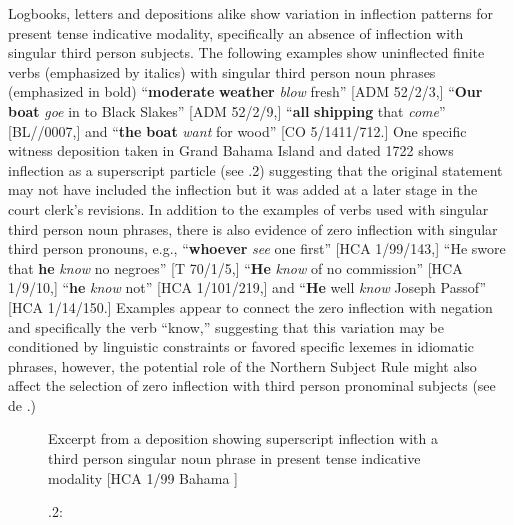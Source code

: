   Logbooks, letters and depositions alike show variation in inflection patterns for present tense indicative modality, specifically an absence of inflection with singular third person subjects. The following examples show uninflected finite verbs (emphasized by italics) with singular third person noun phrases (emphasized in bold) “\textbf{moderate} \textbf{weather} \textit{blow} fresh” [ADM 52/2/3,] “\textbf{Our} \textbf{boat} \textit{goe} in to Black Slakes” [ADM 52/2/9,] “\textbf{all} \textbf{shipping} that \textit{come}” [BL/\citealt{Egerton2395}/0007,] and “\textbf{the} \textbf{boat} \textit{want} for wood” [CO 5/1411/712.] One specific witness deposition taken in Grand Bahama Island and dated 1722 shows inflection as a superscript particle (see .2) suggesting that the original statement may not have included the inflection but it was added at a later stage in the court clerk’s revisions. In addition to the examples of verbs used with singular third person noun phrases, there is also evidence of zero inflection with singular third person pronouns, e.g., “\textbf{whoever} \textit{see} one first” [HCA 1/99/143,] “He swore that \textbf{he} \textit{know} no negroes” [T 70/1/5,] “\textbf{He} \textit{know} of no commission” [HCA 1/9/10,] “\textbf{he} \textit{know} not” [HCA 1/101/219,] and “\textbf{He} well \textit{know} Joseph Passof” [HCA 1/14/150.] Examples appear to connect the zero inflection with negation and specifically the verb “know,” suggesting that this variation may be conditioned by linguistic constraints or favored specific lexemes in idiomatic phrases, however, the potential role of the Northern Subject Rule might also affect the selection of zero inflection with third person pronominal subjects (see de \citealt{Haas2006}.) 

 
\begin{figure}

\caption{\label{fig:key:6}.2:} Excerpt from a deposition showing superscript inflection with a third person singular noun phrase in present tense indicative modality [HCA 1/99 Bahama \citealt{Islands1722}]
\end{figure}


